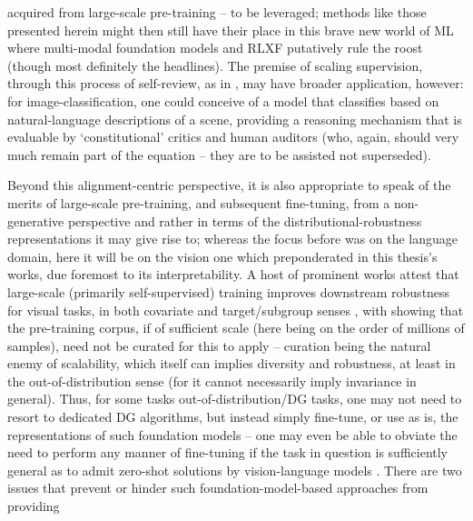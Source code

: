 acquired from large-scale pre-training -- to be leveraged; methods like those presented herein
might then still have their place in this brave new world of ML where multi-modal foundation models
\citep{driess2023palm, huang2023language, openai2023gpt4, katz2023gpt} and RLXF putatively rule the
roost (though most definitely the headlines).
%
The premise of scaling supervision, through this process of self-review, as in
\cite{bai2022constitutional}, may have broader application, however: for image-classification, one
could conceive of a model that classifies based on natural-language descriptions of a scene,
providing a reasoning mechanism that is evaluable by `constitutional' critics and human auditors
(who, again, should very much remain part of the equation -- they are to be assisted not
superseded).
%

%
Beyond this alignment-centric perspective, it is also appropriate to speak of the merits of
large-scale pre-training, and subsequent fine-tuning, from a non-generative perspective and rather
in terms of the distributional-robustness representations it may give rise to; whereas the focus
before was on the language domain, here it will be on the vision one which preponderated in this
thesis's works, due foremost to its interpretability.
%
A host of prominent works attest that large-scale (primarily self-supervised) training improves
downstream robustness for visual tasks, in both covariate \citep{hendrycks2019using,
hendrycks2020pretrained, radford2021learning} and target/subgroup senses \citep{liu2021self,
goyal2022vision}, with \cite{goyal2022vision} showing that the pre-training corpus, if of
sufficient scale (here being on the order of millions of samples), need not be curated for this to
apply -- curation being the natural enemy of scalability, which itself can implies diversity and
robustness, at least in the out-of-distribution sense (for it cannot  necessarily imply invariance
in general).
%
Thus, for some tasks out-of-distribution/DG tasks, one may not need to resort to dedicated DG
algorithms, but instead simply fine-tune, or use as is, the representations of such foundation
models -- one may even be able to obviate the need to perform any manner of fine-tuning if the task
in question is sufficiently general as to admit zero-shot solutions by vision-language models
\citep{radford2021learning, alayrac2022flamingo}.
%
There are two issues that prevent or hinder such foundation-model-based approaches from providing
